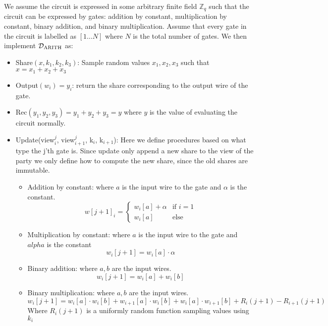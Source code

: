 We assume the circuit is expressed in some arbitrary finite field
$\mathbb{Z}_{q}$ such that the circuit can be expressed by gates: addition by constant,
multiplication by constant, binary addition, and binary multiplication.
Assume that every gate in the circuit is labelled as $[1 \dots N]$ where $N$ is
the total number of gates.
We then implement $\mathcal{D}_{\text{ARITH}}$ as:

\begin{itemize}
  \item Share$(x, k_{1}, k_{2}, k_{3})$: Sample random values
    $x_{1}, x_{2}, x_{3}$ such that $x = x_{1} + x_{2} + x_{3}$
  \item Output$(w_{i}) = y_{i}$: return the share corresponding to the output wire of
    the gate.
  \item Rec$(y_{1}, y_{2}, y_{3}) = y_{1} + y_{2} + y_{3} = y$ where $y$ is the
    value of evaluating the circuit normally.
  \item Update(view$^{j}_{i}$, view$^{j}_{i+1}$, k$_{i}$, k$_{i+1}$): Here we
    define procedures based on what type the j'th gate is. Since update only
    append a new share to the view of the party we only define how to compute
    the new share, since the old shares are immutable.
    \begin{itemize}
      \item Addition by constant: where $a$ is the input wire to the gate
        and $\alpha$ is the constant.
        $$ w[j+1]_{i} =
        \begin{cases} w_{i}[a] + \alpha & \text{if } i = 1 \\
                      w_{i}[a]          & \text{else}       %
        \end{cases}$$
      \item Multiplication by constant: where $a$ is the input wire to the gate
        and $alpha$ is the constant
        $$ w_{i}[j+1] = w_{i}[a] \cdot \alpha$$
      \item Binary addition: where $a, b$ are the input wires.
        $$
        w_{i}[j+1] = w_{i}[a] + w_{i}[b]
        $$
      \item Binary multiplication: where $a, b$ are the input wires.
        $$
        w_{i}[j+1] = w_{i}[a] \cdot w_{i}[b] + w_{i+1}[a] \cdot w_{i}[b] + w_{i}[a] \cdot w_{i+1}[b] + R_{i}(j+1) - R_{i+1}(j+1)
        $$
        Where $R_{i}(j+1)$ is a uniformly random function sampling values using $k_{i}$
    \end{itemize}
\end{itemize}

